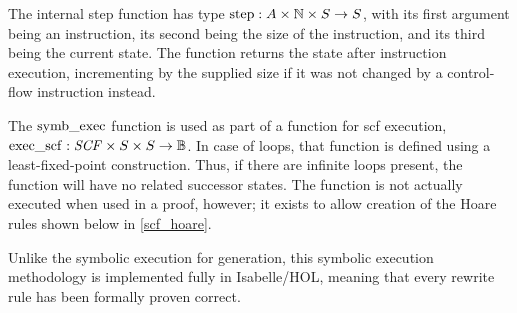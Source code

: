 The internal step function has type $\operatorname{step}:A\times\mathbb{N}\times S\rightarrow S$,%
with its first argument being an instruction, its second being the size of the instruction,
and its third being the current state.
The function returns the state after instruction execution,
incrementing  by the supplied size
if it was not changed by a control-flow instruction instead.

The $\operatorname{symb\_exec}$ function is used as part of a function for \ac{scf} execution,
$\operatorname{exec\_scf}:\mathit{SCF}\times S\times S\rightarrow\mathbb{B}$.
In case of loops, that function is defined using a least-fixed-point construction.
Thus, if there are infinite loops present,
the function will have no related successor states.
The function is not actually executed when used in a proof, however;
it exists to allow creation of the Hoare rules shown below in \cref{scf_hoare}.

Unlike the symbolic execution for generation,
this symbolic execution methodology is implemented fully in Isabelle/HOL,
meaning that every rewrite rule has been formally proven correct.

